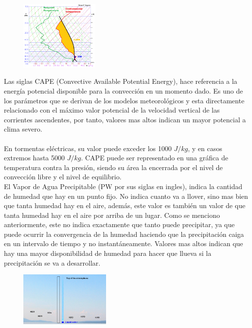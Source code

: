 \documentclass[12pt]{article}
\begin{document}
\begin{figure}
    \centering
    \includegraphics[width=0.35\textwidth]{CAPE.png}
\end{figure}
    
Las siglas CAPE (Convective Available Potential Energy), hace referencia a la energía potencial disponible para la convección en un momento dado. Es uno de los parámetros que se derivan de los modelos meteorológicos y esta directamente relacionado con el máximo valor potencial de la velocidad vertical de las corrientes ascendentes, por tanto, valores mas altos indican un mayor potencial a clima severo. \\ \\

En tormentas eléctricas, su valor puede exceder los 1000 $J/kg$, y en casos extremos hasta 5000 $J/kg$. CAPE puede ser representado en una gráfica de temperatura contra la presión, siendo su área la encerrada por el nivel de convección libre y el nivel de equilibrio. \\

El Vapor de Agua Precipitable (PW por sus siglas en ingles), indica la cantidad de humedad que hay en un punto fijo. No indica cuanto va a llover, sino mas bien que tanta humedad hay en el aire, además, este valor es también un valor de que tanta humedad hay en el aire por arriba de un lugar. Como se menciono anteriormente, este no indica exactamente que tanto puede precipitar, ya que puede ocurrir la convergencia de la humedad haciendo que la precipitación caiga en un intervalo de tiempo y no instantáneamente. Valores mas altos indican que hay una mayor disponibilidad de humedad para hacer que llueva si la precipitación se va a desarrollar. \\

\begin{figure}
    \centering
    \includegraphics[width=0.4\textwidth]{PW.png}
\end{figure}
    
\end{document}
